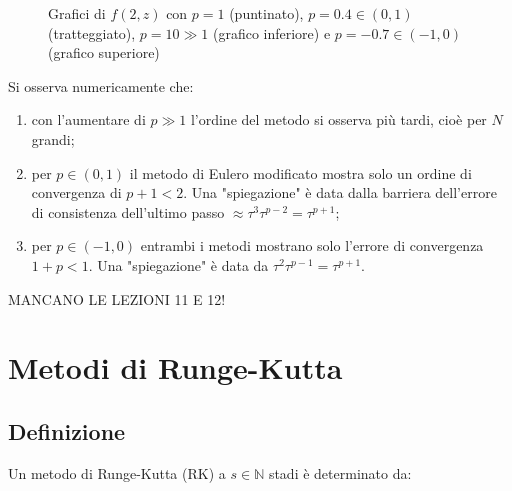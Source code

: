 \documentclass[hidelinks, 10pt]{report}
\begin{document}
\begin{center}
\begin{figure}[H]

\caption{Grafici di $ f(2, z) $ con $ p = 1 $ (puntinato), $ p = 0.4 \in (0, 1) $ (tratteggiato), $ p = 10 \gg 1 $ (grafico inferiore) e $ p = -0.7 \in (-1, 0) $ (grafico superiore)}
\end{figure}
\end{center}

Si osserva numericamente che:
\begin{enumerate}
\item con l'aumentare di $ p \gg 1 $ l'ordine del metodo si osserva pi\`u tardi, cio\`e per $ N $ grandi;
\item per $ p \in (0, 1) $ il metodo di Eulero modificato mostra solo un ordine di convergenza di $ p + 1 < 2 $. Una "spiegazione" \`e data dalla barriera dell'errore di consistenza dell'ultimo passo $ \approx \tau^{3} \tau^{p - 2} = \tau^{p + 1} $;
\item per $ p \in (-1, 0) $ entrambi i metodi mostrano solo l'errore di convergenza $ 1 + p < 1 $. Una "spiegazione" \`e data da $ \tau^{2} \tau^{p - 1} = \tau^{p + 1} $.
\end{enumerate}


										MANCANO LE LEZIONI 11 E 12!


\section{Metodi di Runge-Kutta}
\subsection{Definizione}
Un metodo di Runge-Kutta (RK) a $ s \in \mathbb{N} $ stadi \`e determinato da:
\end{document}
